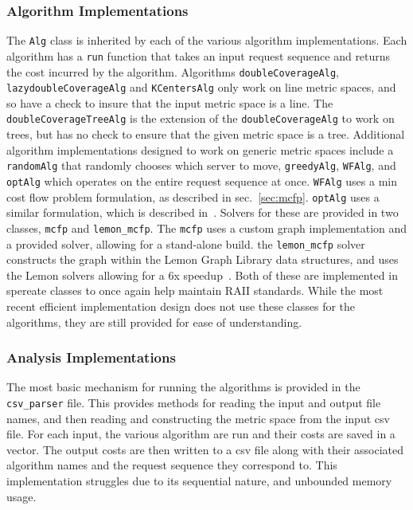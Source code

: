 \subsubsection*{Algorithm Implementations}

The \texttt{Alg} class is inherited by each of the various algorithm implementations. Each algorithm has a \texttt{run} function that takes an input request sequence and returns the cost incurred by the algorithm. Algorithms \texttt{doubleCoverageAlg}, \texttt{lazydoubleCoverageAlg} and \texttt{KCentersAlg} only work on line metric spaces, and so have a check to insure that the input metric space is a line. The \texttt{doubleCoverageTreeAlg} is the extension of the \texttt{doubleCoverageAlg} to work on trees, but has no check to ensure that the given metric space is a tree. Additional algorithm implementations designed to work on generic metric spaces include a \texttt{randomAlg} that randomly chooses which server to move, \texttt{greedyAlg}, \texttt{WFAlg}, and \texttt{optAlg} which operates on the entire request sequence at once. \texttt{WFAlg} uses a min cost flow problem formulation, as described in sec.~\ref{sec:mcfp}. \texttt{optAlg} uses a similar formulation, which is described in~\cite{mcfp2011}. Solvers for these are provided in two classes, \texttt{mcfp} and \texttt{lemon\_mcfp}. The \texttt{mcfp} uses a custom graph implementation and a provided solver, allowing for a stand-alone build. the \texttt{lemon\_mcfp} solver constructs the graph within the Lemon Graph Library data structures, and uses the Lemon solvers allowing for a 6x speedup~\cite{lemon}. Both of these are implemented in spereate classes to once again help maintain RAII standards. While the most recent efficient implementation design does not use these classes for the algorithms, they are still provided for ease of understanding.

\subsubsection*{Analysis Implementations}

The most basic mechanism for running the algorithms is provided in the \texttt{csv\_parser} file. This provides methods for reading the input and output file names, and then reading and constructing the metric space from the input csv file. For each input, the various algorithm are run and their costs are saved in a vector. The output costs are then written to a csv file along with their associated algorithm names and the request sequence they correspond to. This implementation struggles due to its sequential nature, and unbounded memory usage.

